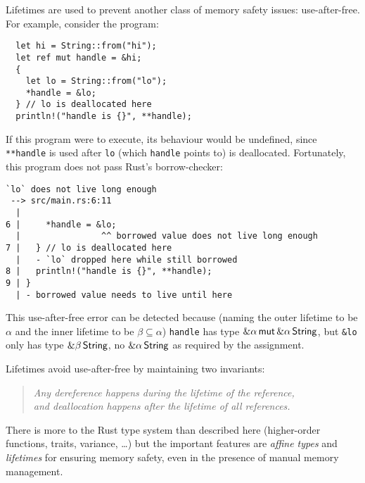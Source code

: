 Lifetimes are used to prevent another class of memory safety issues: use-after-free.
For example, consider the program:
\begin{verbatim}
  let hi = String::from("hi");
  let ref mut handle = &hi;
  {
    let lo = String::from("lo");
    *handle = &lo;
  } // lo is deallocated here
  println!("handle is {}", **handle);
\end{verbatim}
If this program were to execute, its behaviour would be undefined,
since \verb|**handle| is used after \verb|lo|
(which \verb|handle| points to) is deallocated. Fortunately, this program
does not pass Rust's borrow-checker:
\begin{verbatim}
`lo` does not live long enough
 --> src/main.rs:6:11
  |
6 |     *handle = &lo;
  |                ^^ borrowed value does not live long enough
7 |   } // lo is deallocated here
  |   - `lo` dropped here while still borrowed
8 |   println!("handle is {}", **handle);
9 | }
  | - borrowed value needs to live until here
\end{verbatim}
This use-after-free error can be detected because (naming the outer lifetime to be
$\alpha$ and the inner lifetime to be $\beta\subseteq\alpha$) \verb|handle| has type
$\&\alpha\,\mathsf{mut}\,\&\alpha\,\mathsf{String}$, but \verb|&lo| only has type $\&\beta\,\mathsf{String}$, no
$\&\alpha\,\mathsf{String}$ as required by the assignment.

Lifetimes avoid use-after-free by maintaining two invariants:
\begin{quote}\em
  Any dereference happens during the lifetime of the reference, \\
  and deallocation happens after the lifetime of all references.
\end{quote}
There is more to the Rust type system than described here
(higher-order functions, traits, variance, \dots) but the important features
are \emph{affine types} and \emph{lifetimes} for ensuring memory safety,
even in the presence of manual memory management.
